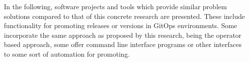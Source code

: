 








In the following,
software projects and tools
which provide similar problem solutions compared to that of
this concrete research are presented.
These include functionality for promoting releases or versions
in GitOps environments.
Some incorporate the same approach as proposed by this research,
being the operator based approach,
some offer command line interface programs or other interfaces
to some sort of automation for promoting.


